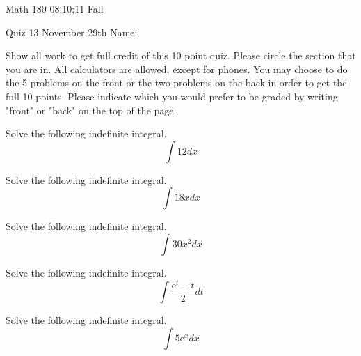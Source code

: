 \documentclass[11pt,epsfig]{article}
\begin{document}
Math 180-08;10;11 Fall

Quiz 13 November 29th \hspace{1.9in} {Name:} {\underline {\hspace{2.5in}}}
\vspace{2pc}

Show all work to get full credit of this 10 point quiz. Please circle the section that you are in. All calculators are allowed, except for phones. You may choose to do the 5 problems on the front or the two problems on the back in order to get the full 10 points. Please indicate which you would prefer to be graded by writing "front" or "back" on the top of the page. 
\vspace{2pc}

\begin{problem}{2}
Solve the following indefinite integral.
\begin{equation*}
\int 12dx
\end{equation*}
\vfill
\end{problem}

\begin{problem}{2}
Solve the following indefinite integral.
\begin{equation*}
\int 18xdx
\end{equation*}
\vfill
\end{problem}

\begin{problem}{2}
Solve the following indefinite integral.
\begin{equation*}
\int 30 x^2 dx
\end{equation*}
\vfill
\end{problem}

\begin{problem}{2}
Solve the following indefinite integral.
\begin{equation*}
\int \frac{\mathrm{e}^t - t}{2} dt
\end{equation*}
\vfill
\end{problem}

\begin{problem}{2}
Solve the following indefinite integral.
\begin{equation*}
\int 5 \mathrm{e}^x dx
\end{equation*}
\vfill
\end{problem}
\end{document}
